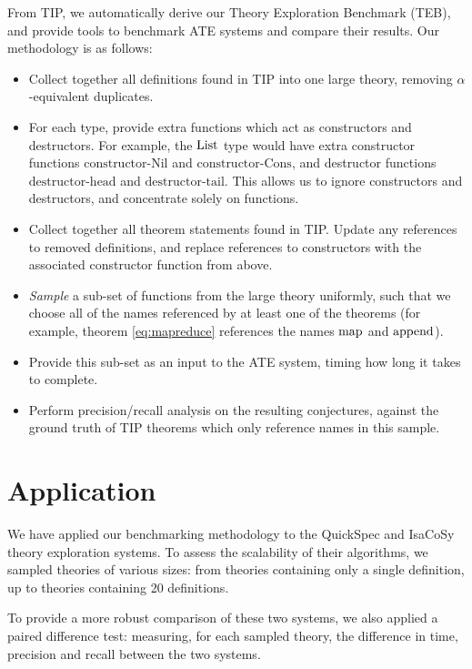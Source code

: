 From TIP, we automatically derive our Theory Exploration Benchmark (TEB), and
provide tools to benchmark ATE systems and compare their results. Our
methodology is as follows:

\begin{itemize}
\item Collect together all definitions found in TIP into one large theory,
  removing $\alpha$-equivalent duplicates.
\item For each type, provide extra functions which act as constructors and
  destructors. For example, the $\text{List}$ type would have extra constructor
  functions $\text{constructor-Nil}$ and $\text{constructor-Cons}$, and
  destructor functions $\text{destructor-head}$ and $\text{destructor-tail}$.
  This allows us to ignore constructors and destructors, and concentrate solely
  on functions.
\item Collect together all theorem statements found in TIP. Update any
  references to removed definitions, and replace references to constructors with
  the associated constructor function from above.
\item \emph{Sample} a sub-set of functions from the large theory uniformly, such
  that we choose all of the names referenced by at least one of the theorems
  (for example, theorem \ref{eq:mapreduce} references the names
  $\text{map}$ and $\text{append}$).
\item Provide this sub-set as an input to the ATE system, timing how long it
  takes to complete.
\item Perform precision/recall analysis on the resulting conjectures, against
  the ground truth of TIP theorems which only reference names in this sample.
\end{itemize}

\section{Application}
\label{sec:application}


We have applied our benchmarking methodology to the QuickSpec and IsaCoSy theory
exploration systems. To assess the scalability of their algorithms, we sampled
theories of various sizes: from theories containing only a single definition, up
to theories containing 20 definitions.

To provide a more robust comparison of these two systems, we also applied a
paired difference test: measuring, for each sampled theory, the difference in
time, precision and recall between the two systems.

